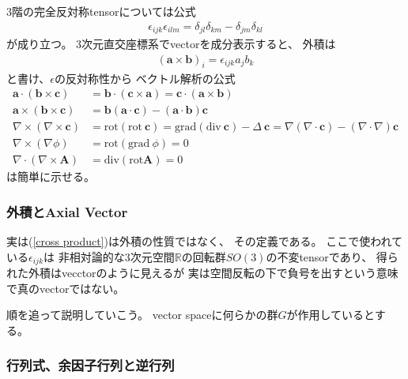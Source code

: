 $3$階の完全反対称tensorについては公式
\begin{align}
    \epsilon_{ijk}\epsilon_{ilm}
    =
    \delta_{jl}\delta_{km}
    -
    \delta_{jm}\delta_{kl}
\label{3rd order epsilon to delta2 formula}
\end{align}
が成り立つ。
$3$次元直交座標系でvectorを成分表示すると、
外積は
\begin{align}
    (\bm{a} \times \bm{b})_i
    =
    \epsilon_{ijk}
    a_j b_k
\label{cross product}
\end{align}
と書け、$\epsilon$の反対称性から
ベクトル解析の公式
\begin{subequations}
\begin{align}
    \bm{a} \cdot (\bm{b} \times \bm{c})
    &=
    \bm{b} \cdot (\bm{c} \times \bm{a})
    =
    \bm{c} \cdot (\bm{a} \times \bm{b})
\\
    \bm{a} \times (\bm{b} \times \bm{c})
    &=
    \bm{b} (\bm{a} \cdot \bm{c})
    -
    (\bm{a} \cdot \bm{b}) \bm{c}
\\
    \nabla \times (\nabla \times \bm{c})
    &=
    \mathrm{rot}(\mathrm{rot}\ \bm{c})
    =
    \mathrm{grad}(\mathrm{div}\ \bm{c})
    -
    \Delta\ \bm{c}
    =
    \nabla (\nabla \cdot \bm{c})
    -
    (\nabla \cdot \nabla) \bm{c}
\label{rot rot = grad div - laplacian}
\\
    \nabla \times (\nabla \phi)
    &=
    \mathrm{rot}(\mathrm{grad}\ \phi)
    = 0
\label{rot grad = 0}
\\
    \nabla \cdot (\nabla \times \bm{A})
    &=
    \mathrm{div}(\mathrm{rot}\bm{A})
    = 0
\label{div rot = 0}
\end{align}
\end{subequations}
は簡単に示せる。

\subsubsection{外積とAxial Vector}

実は(\ref{cross product})は外積の性質ではなく、
その定義である。
ここで使われている$\epsilon_{ijk}$は
非相対論的な$3$次元空間$\mathbb{R}$の回転群$SO(3)$の不変tensorであり、
得られた外積はvecctorのように見えるが
実は空間反転の下で負号を出すという意味で真のvectorではない。

順を追って説明していこう。
vector spaceに何らかの群$G$が作用しているとする。

\subsubsection{行列式、余因子行列と逆行列}

